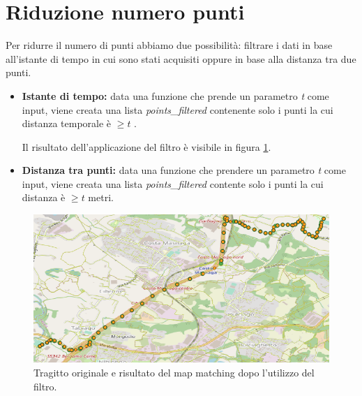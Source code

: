 \documentclass[12pt]{report}
\begin{document}
\chapter*{Riduzione numero punti}
Per ridurre il numero di punti abbiamo due possibilità: filtrare i dati in base all'istante di tempo in cui sono stati acquisiti oppure in base alla distanza tra due punti.
\begin{itemize}
	\item \textbf{Istante di tempo:} data una funzione che prende un parametro \textit{t} come input, viene creata una lista \textit{points\_filtered} contenente solo i punti la cui distanza temporale è $ \ge t $ .
	
	Il risultato dell'applicazione del filtro è visibile in figura \ref{filter}.
	\item \textbf{Distanza tra punti:} data una funzione che prendere un parametro \textit{t} come input, viene creata una lista \textit{points\_filtered} contente solo i punti la cui distanza è $ \ge t$ metri. 
	
\end{itemize}
	\begin{figure}
	\centering
	\includegraphics[scale = 0.43]{figures/tragitto_filtered}
	\caption{Tragitto originale e risultato del map matching dopo l'utilizzo del filtro.}\label{filter}
\end{figure}
	
	
	
\end{document}
